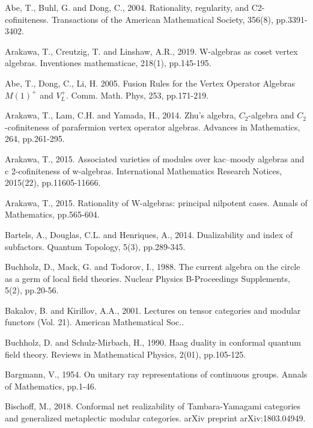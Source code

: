 \documentclass[11pt,b5paper,notitlepage]{article}
\theoremstyle{definition}
\theoremstyle{plain}
\numberwithin{equation}{subsection}
\begin{document}
\begin{thebibliography}{999999}
\footnotesize	

Abe, T., Buhl, G. and Dong, C., 2004. Rationality, regularity, and C2-cofiniteness. Transactions of the American Mathematical Society, 356(8), pp.3391-3402.


Arakawa, T., Creutzig, T. and Linshaw, A.R., 2019. W-algebras as coset vertex algebras. Inventiones mathematicae, 218(1), pp.145-195.

Abe, T., Dong, C.,  Li, H. 2005.  Fusion Rules for the Vertex Operator Algebras $M(1)^+$ and $V_L^+$. Comm. Math. Phys, 253, pp.171-219.


Arakawa, T., Lam, C.H. and Yamada, H., 2014. Zhu's algebra, $C_2$-algebra and $C_2$-cofiniteness of parafermion vertex operator algebras. Advances in Mathematics, 264, pp.261-295.

Arakawa, T., 2015. Associated varieties of modules over kac–moody algebras and c 2-cofiniteness of w-algebras. International Mathematics Research Notices, 2015(22), pp.11605-11666.

Arakawa, T., 2015. Rationality of W-algebras: principal nilpotent cases. Annals of Mathematics, pp.565-604.

Bartels, A., Douglas, C.L. and Henriques, A., 2014. Dualizability and index of subfactors. Quantum Topology, 5(3), pp.289-345.

Buchholz, D., Mack, G. and Todorov, I., 1988. The current algebra on the circle as a germ of local field theories. Nuclear Physics B-Proceedings Supplements, 5(2), pp.20-56.

Bakalov, B. and Kirillov, A.A., 2001. Lectures on tensor categories and modular functors (Vol. 21). American Mathematical Soc..

Buchholz, D. and Schulz-Mirbach, H., 1990. Haag duality in conformal quantum field theory. Reviews in Mathematical Physics, 2(01), pp.105-125.

Bargmann, V., 1954. On unitary ray representations of continuous groups. Annals of Mathematics, pp.1-46.

Bischoff, M., 2018. Conformal net realizability of Tambara-Yamagami categories and generalized metaplectic modular categories. arXiv preprint arXiv:1803.04949.


\end{thebibliography}
\end{document}

